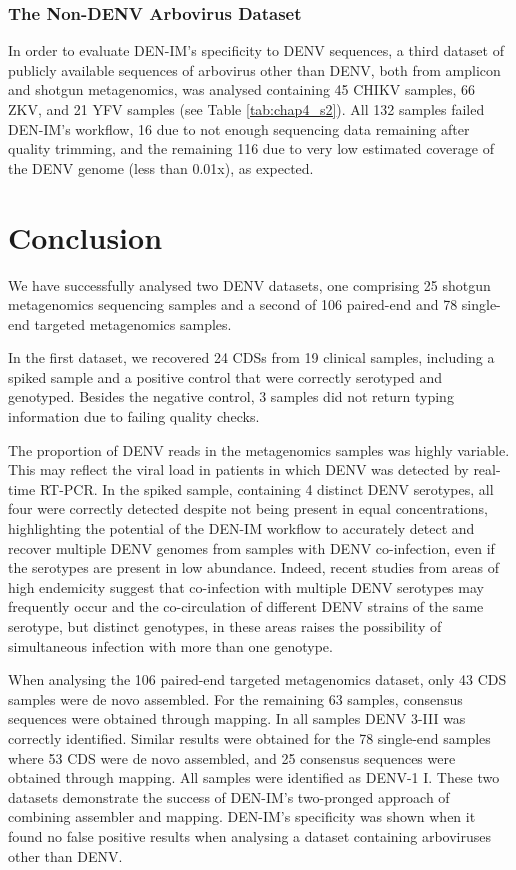 \subsubsection{The Non-DENV Arbovirus Dataset}

In order to evaluate DEN-IM’s specificity to DENV sequences, a third dataset of publicly available sequences of arbovirus other than DENV, both from amplicon and shotgun metagenomics, was analysed containing 45 CHIKV samples, 66 ZKV, and 21 YFV samples (see Table \ref{tab:chap4_s2}). All 132 samples failed DEN-IM’s workflow, 16 due to not enough sequencing data remaining after quality trimming, and the remaining 116 due to very low estimated coverage of the DENV genome (less than 0.01x), as expected. 

\section{Conclusion}

We have successfully analysed two DENV datasets, one comprising 25 shotgun metagenomics sequencing samples and a second of 106 paired-end and 78 single-end targeted metagenomics samples. 

In the first dataset, we recovered 24 CDSs from 19 clinical samples, including a spiked sample and a positive control that were correctly serotyped and genotyped. Besides the negative control, 3 samples did not return typing information due to failing quality checks.

The proportion of DENV reads in the metagenomics samples was highly variable. This may reflect the viral load in patients in which DENV was detected by real-time RT-PCR. In the spiked sample, containing 4 distinct DENV serotypes, all four were correctly detected despite not being present in equal concentrations, highlighting the potential of the DEN-IM workflow to accurately detect and recover multiple DENV genomes from samples with DENV co-infection, even if the serotypes are present in low abundance. Indeed, recent studies from areas of high endemicity suggest that co-infection with multiple DENV serotypes may frequently occur \citep{marinho_meningitis_nodate, reddy_occurrence_2017} and the co-circulation of different DENV strains of the same serotype, but distinct genotypes, in these areas \citep{marinho_meningitis_nodate} raises the possibility of simultaneous infection with more than one genotype.

When analysing the 106 paired-end targeted metagenomics dataset, only 43 CDS samples were de novo assembled. For the remaining 63 samples, consensus sequences were obtained through mapping. In all samples DENV 3-III was correctly identified. Similar results were obtained for the 78 single-end samples where 53 CDS were de novo assembled, and 25 consensus sequences were obtained through mapping. All samples were identified as DENV-1 I. These two datasets demonstrate the success of DEN-IM’s two-pronged approach of combining assembler and mapping. DEN-IM’s specificity was shown when it found no false positive results when analysing a dataset containing arboviruses other than DENV. 

